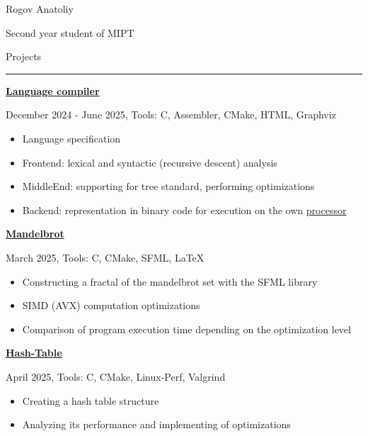 \documentclass[letterpaper, 12pt]{letter}
\begin{document}
\hspace*{0.5cm}
\begin{minipage}[t]{0.6\textwidth}
\setlength{\baselineskip}{1.5\baselineskip}
\vspace{0.8cm}
{\huge Rogov Anatoliy}

{\large Second year student of MIPT}

\vspace{0.5cm}

{\large Projects}
\vspace{0.1cm}
\rule{\linewidth}{0.4pt}

{\large \textbf{\href{https://github.com/rogovogor17/Language}{Language compiler}}}

{\small December 2024 - June 2025, Tools: C, Assembler, CMake, HTML, Graphviz}

\begin{itemize}
    \item \small{Language specification}
    \item Frontend: lexical and syntactic (recursive descent) analysis
    \item MiddleEnd: supporting for tree standard, performing optimizations
    \item Backend: representation in binary code for execution on the own \href{https://github.com/rogovogor17/Processor}{processor}
\end{itemize}

{\large \textbf{\href{https://github.com/rogovogor17/Mandelbrot}{Mandelbrot}}}

{\small March 2025, Tools: C, CMake, SFML, \LaTeX}

\begin{itemize}
    \item \small{Constructing a fractal of the mandelbrot set with the SFML library}
    \item SIMD (AVX) computation optimizations
    \item Comparison of program execution time depending on the optimization level
\end{itemize}

{\large \textbf{\href{https://github.com/rogovogor17/Hash-Table}{Hash-Table}}}

{\small April 2025, Tools: C, CMake, Linux-Perf, Valgrind}

\begin{itemize}
    \item \small{Creating a hash table structure}
    \item \small{Analyzing its performance and implementing of optimizations}
\end{itemize}


\end{minipage}
\end{document}
